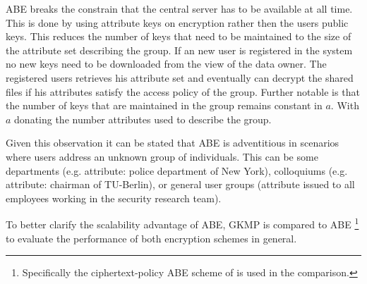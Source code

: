\ac{ABE} breaks the constrain that the central server has to be available at all time. This is done by using attribute keys on encryption rather then the users public keys. This reduces the number of keys that need to be maintained to the size of the attribute set describing the group. If an new user is registered in the system no new keys need to be downloaded from the view of the data owner. The registered users retrieves his attribute set and eventually can decrypt the shared files if his attributes satisfy the access policy of the group. Further notable is that the number of keys that are maintained in the group remains constant in $a$. With $a$ donating the number attributes used to describe the group. 

Given this observation it can be stated that \ac{ABE} is adventitious in scenarios where users address an unknown group of individuals. This can be some departments (e.g. attribute: police department of New York), colloquiums (e.g. attribute: chairman of TU-Berlin), or general user groups (attribute issued to all employees working in the security research team).

To better clarify the scalability advantage of \ac{ABE}, GKMP is compared to ABE \footnote{Specifically the ciphertext-policy ABE scheme of \cite{bethencourt2007ciphertext} is used in the comparison.} to evaluate the performance of both encryption schemes in general.

